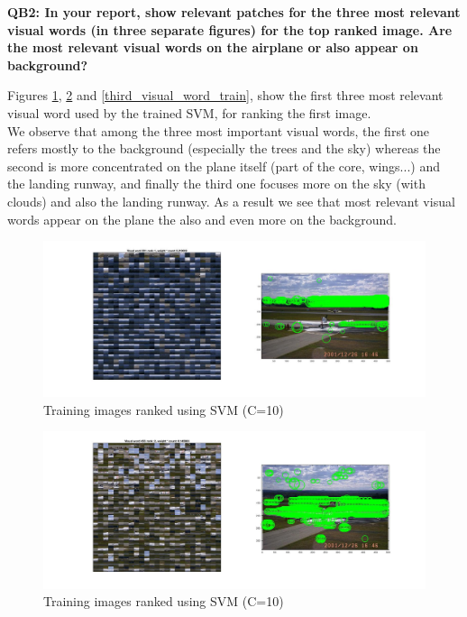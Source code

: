 \documentclass[a4paper,11pt]{exam}
\begin{document}
\textbf{QB2: In your report, show relevant patches for the three most relevant visual words (in three separate figures) for the top ranked image. Are the most relevant visual words on the airplane or also appear on background?\\}

Figures \ref{first_visual_word_train}, \ref{second_visual_word_train} and \ref{third_visual_word_train}, show the first three most relevant visual word used by the trained SVM, for ranking the first image.\\

We observe that among the three most important visual words, the first one refers mostly to the background (especially the trees and the sky) whereas the second is more concentrated on the plane itself (part of the core, wings...) and the landing runway, and finally the third one focuses more on the sky (with clouds) and also the landing runway. As a result we see that most relevant visual words appear on the plane the also and even more on the background.

\begin{figure}[!h]
\centering
\includegraphics[width=15cm]{figures/first_visual_word_train.jpg}
\caption{Training images ranked using SVM (C=10)}    
\label{first_visual_word_train}
\end{figure}

\begin{figure}[!h]
\centering
\includegraphics[width=15cm]{figures/second_visual_word_train.jpg}
\caption{Training images ranked using SVM (C=10)}    
\label{second_visual_word_train}
\end{figure}
\end{document}
